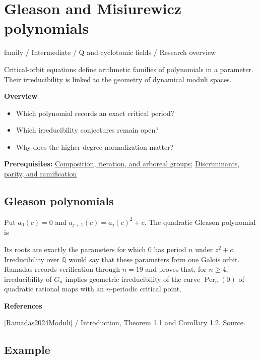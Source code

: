 \documentclass[11pt,a4paper,oneside,openany]{book}
\newcommand{\atlasdisplay}[1]{\par\begingroup\centering\vspace{3pt}\noindent\adjustbox{max width=\linewidth}{\(\displaystyle #1\)}\par\vspace{5pt}\endgroup}
\newenvironment{sources}{\par\smallskip\begingroup\footnotesize\color{atlasgray}\leftskip=10pt\setlength{\parskip}{2pt}}{\par\endgroup\smallskip}
\begin{document}
\chapter{Gleason and Misiurewicz polynomials}\label{article:critical-parameter-polynomials}\hypertarget{article:critical-parameter-polynomials}{}\color{black}
{\sffamily\small\color{atlasgold}family / Intermediate / Q and cyclotomic fields / Research overview}\par\medskip
Critical-orbit equations define arithmetic families of polynomials in a parameter. Their irreducibility is linked to the geometry of dynamical moduli spaces.\par\medskip
\textbf{Overview}\begin{itemize}
\item Which polynomial records an exact critical period?
\item Which irreducibility conjectures remain open?
\item Why does the higher-degree normalization matter?
\end{itemize}
{\small\textbf{Prerequisites:} \hyperlink{article:composition-iteration}{Composition, iteration, and arboreal groups}; \hyperlink{article:discriminants}{Discriminants, parity, and ramification}}\par
{}\section{Gleason polynomials}
\color{black} Put \(a_0(c)=0\) and \(a_{j+1}(c)=a_j(c)^2+c\). The quadratic Gleason polynomial is\par

\atlasdisplay{G_n(c)=\prod_{d\mid n}a_d(c)^{\mu(n/d)}\in\mathbb Z[c].}
\color{black} Its roots are exactly the parameters for which \(0\) has period \(n\) under \(z^2+c\). Irreducibility over \(\mathbb Q\) would say that these parameters form one Galois orbit. Ramadas records verification through \(n=19\) and proves that, for \(n\ge4\), irreducibility of \(G_n\) implies geometric irreducibility of the curve \(\operatorname{Per}_n(0)\) of quadratic rational maps with an \(n\)-periodic critical point.\par
\begin{sources}
\textbf{References}\par\smallskip
\noindent\hyperlink{ref:Ramadas2024Moduli}{[Ramadas2024Moduli]} / Introduction, Theorem 1.1 and Corollary 1.2.  \href{https://doi.org/10.1093/imrn/rnae126}{Source}.\par
\end{sources}\color{black}
\section{Example}
\end{document}
